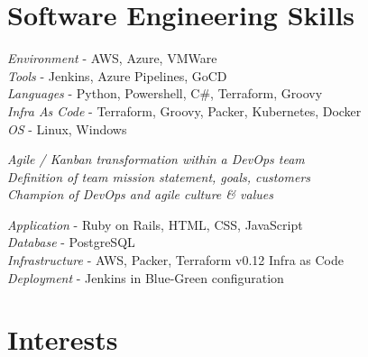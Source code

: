 \documentclass[10pt]{article} %
\begin{document}

\section{Software Engineering Skills}

{
\textit{Environment} - AWS, Azure, VMWare \\
\textit{Tools} - Jenkins, Azure Pipelines, GoCD \\
\textit{Languages} - Python, Powershell, C\#, Terraform, Groovy \\
\textit{Infra As Code} - Terraform, Groovy, Packer, Kubernetes, Docker \\
\textit{OS} - Linux, Windows
}


{
\textit{Agile / Kanban transformation within a DevOps team}\\
\textit{Definition of team mission statement, goals, customers}\\
\textit{Champion of DevOps and agile culture \& values}
}


{
\textit{Application} - Ruby on Rails, HTML, CSS, JavaScript\\
\textit{Database} - PostgreSQL\\
\textit{Infrastructure} - AWS, Packer, Terraform v0.12 Infra as Code\\
\textit{Deployment} - Jenkins in Blue-Green configuration
}


\section{Interests}

\end{document}
